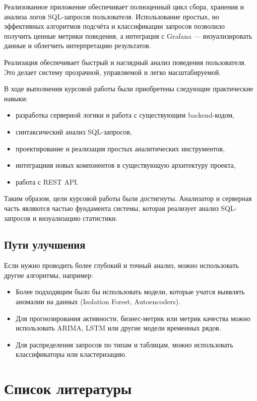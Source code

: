 \documentclass[14pt]{extarticle}
\begin{document}
Реализованное приложение обеспечивает полноценный цикл сбора, хранения и анализа логов SQL-запросов пользователя. Использование простых, но эффективных алгоритмов подсчёта и классификации запросов позволило получить ценные метрики поведения, а интеграция с Grafana — визуализировать данные и облегчить интерпретацию результатов.

Реализация обеспечивает быстрый и наглядный анализ поведения пользователя. Это делает систему прозрачной, управляемой и легко масштабируемой.

В ходе выполнения курсовой работы были приобретены следующие практические навыки:
\begin{itemize}
    \item разработка серверной логики и работа с существующим backend-кодом, 
    \item синтаксический анализ SQL-запросов,
    \item проектирование и реализация простых аналитических инструментов,
    \item интеграциия новых компонентов в существующую архитектуру проекта,
    \item работа с REST API.
\end{itemize}

Таким образом, цели курсовой работы были достигнуты. Анализатор и серверная часть являются частью фундамента системы, которая реализует анализ SQL-запросов и визуализацию статистики.

\subsection*{Пути улучшения}

Если нужно проводить более глубокий и точный анализ, можно использовать другие алгоритмы, например:

\begin{itemize}
    \item Более подходящим было бы использовать модели, которые учатся выявлять аномалии на данных (Isolation Forest, Autoencoders).
    \item Для прогнозирования активности, бизнес-метрик или метрик качества можно использовать ARIMA, LSTM или другие модели временных рядов.
    \item Для распределения запросов по типам и таблицам, можно использовать классификаторы или кластеризацию.
\end{itemize}

\newpage
\section*{Список литературы}
\end{document}
